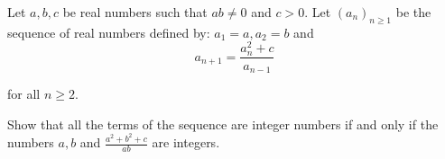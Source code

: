 Let $a,b,c$ be real numbers such that $ab\not= 0$ and $c>0$. Let $(a_{n})_{n\geq 1}$ be the sequence of real numbers defined by: $a_{1}=a, a_{2}=b$ and\[a_{n+1}=\frac{a_{n}^{2}+c}{a_{n-1}}\]

for all $n\geq 2$.

Show that all the terms of the sequence are integer numbers if and only if the numbers $a,b$ and $\frac{a^{2}+b^{2}+c}{ab}$ are integers.